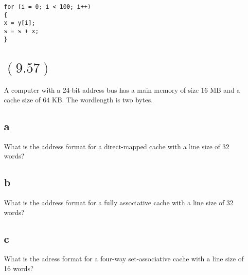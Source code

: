 \documentclass[letterpaper,12pt,titlepage]{article}
\begin{document}
\lstset{language=C}
\begin{lstlisting}
for (i = 0; i < 100; i++)
{
x = y[i];
s = s + x;
}
\end{lstlisting}


\begin{mdframed}[style=MyFrame]
\end{mdframed}

\section*{$(9.57)$}

A computer with a 24-bit address bus has a main memory of size 16 MB and a cache size of 64 KB. The wordlength is two bytes.

\subsection*{a} What is the address format for a direct-mapped cache with a line size of 32 words?
\begin{mdframed}[style=MyFrame]
\end{mdframed}
\subsection*{b} What is the address format for a fully associative cache with a line size of 32 words?
\begin{mdframed}[style=MyFrame]
\end{mdframed}
\subsection*{c} What is the adress format for a four-way set-associative cache with a line size of 16 words?
\begin{mdframed}[style=MyFrame]
\end{mdframed}





\end{document}
